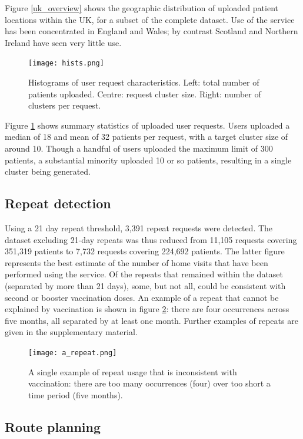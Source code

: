 \documentclass[review]{elsarticle}
\begin{document}
Figure \ref{uk_overview} shows the geographic distribution of uploaded patient locations within the UK, for a subset of the complete dataset. Use of the service has been concentrated in England and Wales; by contrast Scotland and Northern Ireland have seen very little use.  

\begin{figure}[H]
\centering
\texttt{[image: hists.png]}
\caption{Histograms of user request characteristics. Left: total number of patients uploaded. Centre: request cluster size. Right: number of clusters per request.}
\label{hists}
\end{figure}

Figure \ref{hists} shows summary statistics of uploaded user requests. Users uploaded a median of 18 and mean of 32 patients per request, with a target cluster size of around 10. Though a handful of users uploaded the maximum limit of 300 patients, a substantial minority uploaded 10 or so patients, resulting in a single cluster being generated. 

\subsection{Repeat detection}

Using a 21 day repeat threshold, 3,391 repeat requests were detected. The dataset excluding 21-day repeats was thus reduced from 11,105 requests covering 351,319 patients to 7,732 requests covering 224,692 patients. The latter figure represents the best estimate of the number of home visits that have been performed using the service. Of the repeats that remained within the dataset (separated by more than 21 days), some, but not all, could be consistent with second or booster vaccination doses. An example of a repeat that cannot be explained by vaccination is shown in figure \ref{a_repeat}: there are four occurrences across five months, all separated by at least one month. Further examples of repeats are given in the supplementary material. 

\begin{figure}[H]
\centering
\texttt{[image: a\_repeat.png]}
\caption{A single example of repeat usage that is inconsistent with vaccination: there are too many occurrences (four) over too short a time period (five months).}
\label{a_repeat}
\end{figure}


\subsection{Route planning}
\end{document}
